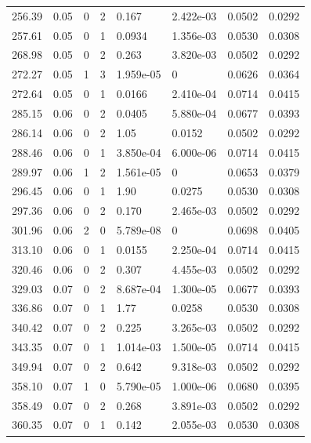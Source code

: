 \documentclass[preview]{standalone}
\begin{document}
{{{\begin{tabular}{L{1.2cm}C{1.2cm} C{0.3cm}C{0.5cm} C{1.4cm}C{1.4cm} C{1.4cm}C{1.4cm}}
  256.39  &  0.05  & 0     &  2 &  0.167  & 2.422e-03  & 0.0502 &  0.0292   \\ 
  257.61  &  0.05  & 0     &  1 &  0.0934  & 1.356e-03  & 0.0530 &  0.0308   \\ 
  268.98  &  0.05  & 0     &  2 &  0.263  & 3.820e-03  & 0.0502 &  0.0292   \\ 
  272.27  &  0.05  & 1     &  3 &  1.959e-05  & 0  & 0.0626 &  0.0364   \\ 
  272.64  &  0.05  & 0     &  1 &  0.0166  & 2.410e-04  & 0.0714 &  0.0415   \\ 
  285.15  &  0.06  & 0     &  2 &  0.0405  & 5.880e-04  & 0.0677 &  0.0393   \\ 
  286.14  &  0.06  & 0     &  2 &  1.05  & 0.0152  & 0.0502 &  0.0292   \\ 
  288.46  &  0.06  & 0     &  1 &  3.850e-04  & 6.000e-06  & 0.0714 &  0.0415   \\ 
  289.97  &  0.06  & 1     &  2 &  1.561e-05  & 0  & 0.0653 &  0.0379   \\ 
  296.45  &  0.06  & 0     &  1 &  1.90  & 0.0275  & 0.0530 &  0.0308   \\ 
  297.36  &  0.06  & 0     &  2 &  0.170  & 2.465e-03  & 0.0502 &  0.0292   \\ 
  301.96  &  0.06  & 2     &  0 &  5.789e-08  & 0  & 0.0698 &  0.0405   \\ 
  313.10  &  0.06  & 0     &  1 &  0.0155  & 2.250e-04  & 0.0714 &  0.0415   \\ 
  320.46  &  0.06  & 0     &  2 &  0.307  & 4.455e-03  & 0.0502 &  0.0292   \\ 
  329.03  &  0.07  & 0     &  2 &  8.687e-04  & 1.300e-05  & 0.0677 &  0.0393   \\ 
  336.86  &  0.07  & 0     &  1 &  1.77  & 0.0258  & 0.0530 &  0.0308   \\ 
  340.42  &  0.07  & 0     &  2 &  0.225  & 3.265e-03  & 0.0502 &  0.0292   \\ 
  343.35  &  0.07  & 0     &  1 &  1.014e-03  & 1.500e-05  & 0.0714 &  0.0415   \\ 
  349.94  &  0.07  & 0     &  2 &  0.642  & 9.318e-03  & 0.0502 &  0.0292   \\ 
  358.10  &  0.07  & 1     &  0 &  5.790e-05  & 1.000e-06  & 0.0680 &  0.0395   \\ 
  358.49  &  0.07  & 0     &  2 &  0.268  & 3.891e-03  & 0.0502 &  0.0292   \\ 
  360.35  &  0.07  & 0     &  1 &  0.142  & 2.055e-03  & 0.0530 &  0.0308   \\ 

\end{tabular}}}}
\end{document}
